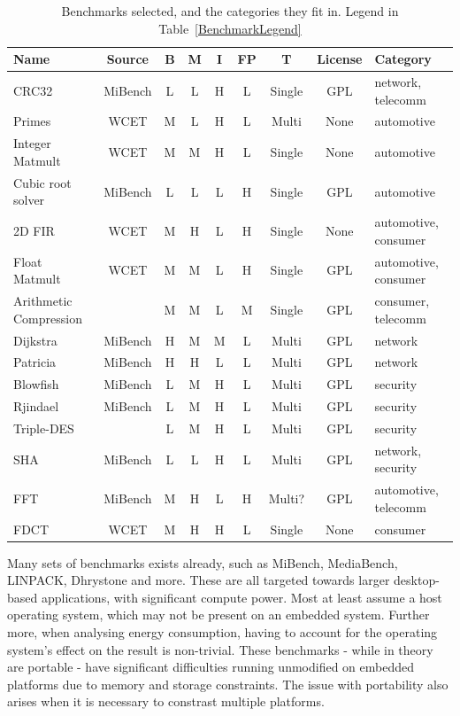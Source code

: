 \documentclass[twocolumn]{article}
\begin{document}
\begin{table}[th!]
\centering
	\begin{tabular}{l c c c c c c c l}
	Name				 	& Source 	& B & M & I & FP& T 		& License & Category \\
	\hline
	CRC32					& MiBench 	& L & L & H & L & Single 	& GPL	& network, telecomm	\\
	Primes					& WCET 		& M & L & H & L & Multi 	& None	& automotive	\\
	Integer Matmult			& WCET	 	& M & M & H & L & Single 	& None	& automotive	\\
	Cubic root solver		& MiBench 	& L & L & L & H & Single 	& GPL	& automotive	\\
	2D FIR					& WCET 		& M & H & L & H & Single 	& None	& automotive, consumer	\\
	Float Matmult			& WCET 		& M & M & L & H & Single 	& GPL	& automotive, consumer	\\
	Arithmetic Compression	&			& M & M & L & M & Single 	& GPL	& consumer, telecomm	\\
	Dijkstra				& MiBench 	& H & M & M & L & Multi 	& GPL	& network	\\
	Patricia				& MiBench 	& H & H & L & L & Multi 	& GPL	& network	\\
	Blowfish				& MiBench 	& L & M & H & L & Multi 	& GPL	& security	\\
	Rjindael				& MiBench 	& L & M & H & L & Multi 	& GPL	& security	\\
	Triple-DES				&		 	& L & M & H & L & Multi 	& GPL	& security	\\
	SHA						& MiBench 	& L & L & H & L & Multi 	& GPL	& network, security	\\
	FFT						& MiBench 	& M & H & L & H & Multi?	&  GPL	& automotive, telecomm	\\
	FDCT					& WCET 		& M & H & H & L & Single 	& None	& consumer	\\
	\end{tabular}
\caption{Benchmarks selected, and the categories they fit in. Legend in Table~\ref{BenchmarkLegend}}
\label{Table:BenchmarkTable}
\end{table}


Many sets of benchmarks exists already, such as MiBench\cite{Guthaus2001}, MediaBench\cite{Fritts2009}, LINPACK\cite{Dongarra2003}, Dhrystone\cite{Weicker1988} and more. These are all targeted towards larger desktop-based applications, with significant compute power. Most at least assume a host operating system, which may not be present on an embedded system. Further more, when analysing energy consumption, having to account for the operating system’s effect on the result is non-trivial. These benchmarks - while in theory are portable - have significant difficulties running unmodified on embedded platforms due to memory and storage constraints. The issue with portability also arises when it is necessary to constrast multiple platforms.
\end{document}
